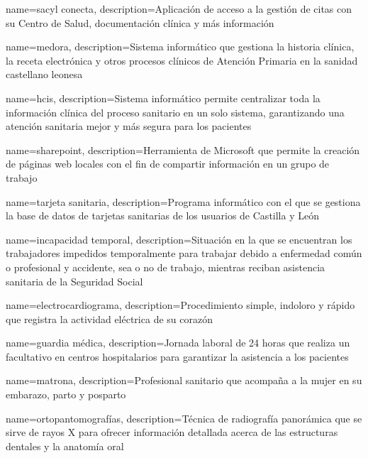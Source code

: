 \makenoidxglossaries

{
    name={sacyl conecta},
    description={Aplicación de acceso a la gestión de citas con su Centro de Salud, documentación clínica y más información}
}

{
    name={medora},
    description={Sistema informático que gestiona la historia clínica, la receta electrónica y otros procesos clínicos de Atención Primaria en la sanidad castellano leonesa}
}

{
    name={hcis},
    description={Sistema informático permite centralizar toda la información clínica del proceso sanitario en un solo sistema, garantizando una atención sanitaria mejor y más segura para los pacientes}
}

{
    name={sharepoint},
    description={Herramienta de Microsoft que permite la creación de páginas web locales con el fin de compartir información en un grupo de trabajo}
}

{
    name={tarjeta sanitaria},
    description={Programa informático con el que se gestiona la base de datos de tarjetas sanitarias de los usuarios de Castilla y León}
}

{
    name={incapacidad temporal},
    description={Situación en la que se encuentran los trabajadores impedidos temporalmente para trabajar debido a enfermedad común o profesional y accidente, sea o no de trabajo, mientras reciban asistencia sanitaria de la Seguridad Social}
}

{
    name={electrocardiograma},
    description={Procedimiento simple, indoloro y rápido que registra la actividad eléctrica de su corazón}
}

{
    name={guardia médica},
    description={Jornada laboral de 24 horas que realiza un facultativo en centros hospitalarios para garantizar la asistencia a los pacientes}
}

{
    name={matrona},
    description={Profesional sanitario que acompaña a la mujer en su embarazo, parto y posparto}
}

{
    name={ortopantomografías},
    description={Técnica de radiografía panorámica que se sirve de rayos X para ofrecer información detallada acerca de
    las estructuras dentales y la anatomía oral}
}

